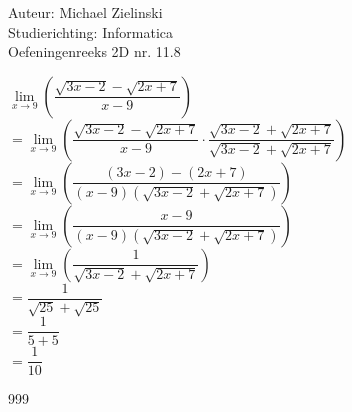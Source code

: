 \documentclass[a4paper]{article}
\begin{document}
  
\noindent \large Auteur: Michael Zielinski \\
\noindent \large Studierichting: Informatica\\
\noindent \large Oefeningenreeks 2D nr. 11.8\\
\medskip
\normalsize

$\lim\limits_{x\rightarrow 9} \left(\dfrac{\sqrt{3x-2}-\sqrt{2x+7}}{x-9}\right)$ \\

$= \lim\limits_{x\rightarrow 9} \left(\dfrac{\sqrt{3x-2}-\sqrt{2x+7}}{x-9} \cdot \dfrac{\sqrt{3x-2}+\sqrt{2x+7}}{\sqrt{3x-2}+\sqrt{2x+7}}\right)$ \\

$= \lim\limits_{x\rightarrow 9} \left(\dfrac{\left(3x-2\right)-\left(2x+7\right)}{\left(x-9\right)\left(\sqrt{3x-2}+\sqrt{2x+7}\right)}\right)$ \\

$= \lim\limits_{x\rightarrow 9} \left(\dfrac{x-9}{\left(x-9\right)\left(\sqrt{3x-2}+\sqrt{2x+7}\right)}\right)$ \\

$= \lim\limits_{x\rightarrow 9} \left(\dfrac{1}{\sqrt{3x-2}+\sqrt{2x+7}}\right)$ \\

$= \dfrac{1}{\sqrt{25}+\sqrt{25}}$ \\

$= \dfrac{1}{5+5}$ \\

$= \dfrac{1}{10}$ \\

\begin{thebibliography}{999}
\end{thebibliography}
\end{document}
